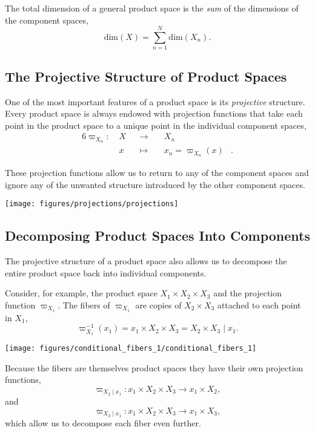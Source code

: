 \documentclass[]{article}
\begin{document}
The total dimension of a general product space is the \emph{sum} of the
dimensions of the component spaces, \[
\mathrm{dim}(X) = \sum_{n = 1}^{N} \mathrm{dim}(X_{n}).
\]

\hypertarget{the-projective-structure-of-product-spaces}{%
\subsection{The Projective Structure of Product
Spaces}\label{the-projective-structure-of-product-spaces}}

One of the most important features of a product space is its
\emph{projective} structure. Every product space is always endowed with
projection functions that take each point in the product space to a
unique point in the individual component spaces, \[
\begin{aligned}{6}
\varpi_{X_{n}} :\; &X& &\rightarrow& \; &X_{n}&
\\
&x& &\mapsto& &x_{n} = \varpi_{X_{n}}(x)&.
\end{aligned}
\]

These projection functions allow us to return to any of the component
spaces and ignore any of the unwanted structure introduced by the other
component spaces.

\texttt{[image: figures/projections/projections]}

\hypertarget{sec:decomposing_product_spaces}{%
\subsection{Decomposing Product Spaces Into
Components}\label{sec:decomposing_product_spaces}}

The projective structure of a product space also allows us to decompose
the entire product space back into individual components.

Consider, for example, the product space
\(X_{1} \times X_{2} \times X_{3}\) and the projection function
\(\varpi_{X_{1}}\). The fibers of \(\varpi_{X_{1}}\) are copies of
\(X_{2} \times X_{3}\) attached to each point in \(X_{1}\), \[
\varpi_{X_{1}}^{-1}(x_{1})
= x_{1} \times X_{2} \times X_{3}
= X_{2} \times X_{3} \mid x_{1}.
\]

\texttt{[image: figures/conditional\_fibers\_1/conditional\_fibers\_1]}

Because the fibers are themselves product spaces they have their own
projection functions, \[
\varpi_{X_{2} \mid x_{1}} : x_{1} \times X_{2} \times X_{3} \rightarrow x_{1} \times X_{2},
\] and \[
\varpi_{X_{3} \mid x_{1}} : x_{1} \times X_{2} \times X_{3} \rightarrow x_{1} \times X_{3},
\] which allow us to decompose each fiber even further.
\end{document}
